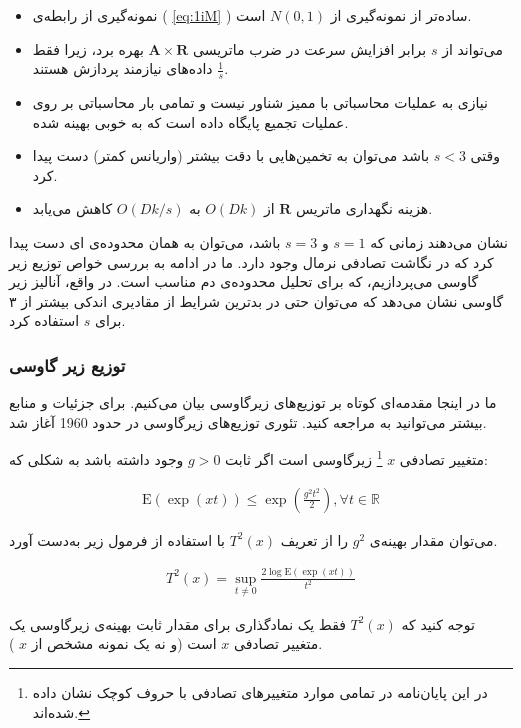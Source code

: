 \begin{itemize}
\item
نمونه‌گیری از رابطه‌ی (%
\ref{eq:1iM}%
) ساده‌تر از نمونه‌گیری از
$N(0,1)$
است.
\item
می‌تواند از 
$s$
برابر افزایش سرعت در ضرب ماتریسی 
$\mathbf{A} \times \mathbf{R}$
بهره برد، زیرا فقط
$\frac{1}{s}$
داده‌های نیازمند پردازش هستند.
\item
نیازی به عملیات محاسباتی با ممیز شناور نیست و تمامی بار محاسباتی بر روی عملیات تجمیع پایگاه داده است که به خوبی بهینه شده.
\item
وقتی 
$s<3$
باشد می‌توان به تخمین‌هایی با دقت بیشتر (واریانس کمتر) دست پیدا کرد.
\item
هزینه نگهداری ماتریس 
$\mathbf{R}$
از 
$O(Dk)$
به 
$O(Dk/s)$
کاهش می‌یابد.
\end{itemize}

\cite{litez2, litez3}
نشان ‌می‌دهند زمانی که 
$s=1$
و 
$s=3$
باشد، می‌توان به همان محدوده‌ی 
ای دست پیدا کرد که در نگاشت تصادفی نرمال وجود دارد. ما در ادامه به بررسی خواص توزیع زیر گاوسی می‌پردازیم، که برای تحلیل محدوده‌ی دم مناسب است. در واقع، آنالیز زیر گاوسی نشان می‌دهد که می‌توان حتی در بدترین شرایط از مقادیری اندکی بیشتر از ۳ برای 
$s$
استفاده کرد.

\subsubsection{
توزیع زیر گاوسی
}

ما در اینجا مقدمه‌ای کوتاه بر توزیع‌های زیرگاوسی بیان می‌کنیم. برای جزئیات و منابع بیشتر می‌توانید به
\cite{litez40}
مراجعه کنید. تئوری توزیع‌های زیرگاوسی در حدود 1960 آغاز شد.

متغییر تصادفی 
$x$
\footnote{
در این پایان‌نامه در تمامی موارد متغییرهای تصادفی با حروف کوچک نشان داده شده‌اند.
}
زیرگاوسی است اگر ثابت 
$g > 0$
وجود داشته باشد به شکلی که:

\begin{align}
\mathrm{E}(\exp (xt)) \leq \exp \left( \frac{g^2 t^2}{2} \right), \forall t \in \mathbb{R}
\label{eq:1iN}
\end{align}

می‌توان مقدار بهینه‌ی 
$g^2$ 
را از تعریف 
$T^2(x)$
با استفاده از فرمول زیر به‌دست آورد.

\begin{align}
T^2(x) = \sup_{t \neq 0} \frac{2 \log \mathrm{E}\left(\exp(xt)\right)}{t^2}
\label{eq:1iP}
\end{align}

توجه کنید که 
$T^2(x)$
فقط یک نمادگذاری برای مقدار ثابت بهینه‌ی زیرگاوسی یک متغییر تصادفی 
$x$
است (و نه یک نمونه مشخص از 
$x$
).

